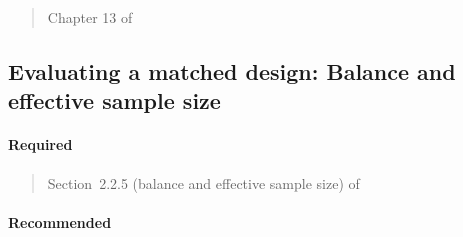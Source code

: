 \documentclass[12pt]{article}
\begin{document}
\begin{verse}  \end{verse}

\begin{verse}  \end{verse}

\begin{verse}  \end{verse}

\begin{verse} Chapter 13 of  \end{verse}

\begin{verse}  \end{verse}

\subsection{Evaluating a matched design: Balance and effective sample size}

\paragraph*{Required}

\begin{verse} Section~2.2.5 (balance and effective sample size) of  \end{verse}

\begin{verse}  \end{verse}

\paragraph*{Recommended}

\begin{verse}  \end{verse}

\begin{verse}  \end{verse}

\begin{verse}  \end{verse}

\begin{verse}  \end{verse}
\end{document}

